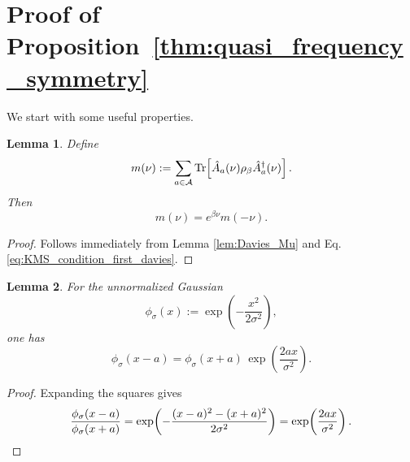 \documentclass[showpacs,amsmath,amssymb,twocolumn,prx,superscriptaddress,10pt,aps,nofootinbib]{revtex4-2}
\newtheorem{lemma}{Lemma}
\begin{document}


\section{Proof of Proposition~\ref{thm:quasi_frequency_symmetry}}
\label{app:proof_quasi_frequency_symmetry}

We start with some useful properties.

\begin{lemma}
\label{lem:DB_davies_identity}
Define
\begin{equation}
    m(\nu):=
    \sum_{a\in\mathcal A}
    \Tr\!\left[\hat A_a(\nu)\rho_\beta \hat A_a^\dagger(\nu)\right].
\end{equation}
Then
\begin{equation}
    m(\nu)=e^{\beta\nu}m(-\nu).
\end{equation}
\end{lemma}

\begin{proof}
Follows immediately from Lemma  \ref{lem:Davies_Mu} and Eq. \eqref{eq:KMS_condition_first_davies}.

\end{proof}

\begin{lemma}
\label{lem:Gaussian_reflection}
For the unnormalized Gaussian
\begin{equation}
    \phi_\sigma(x):=\exp\!\left(-\frac{x^2}{2\sigma^2}\right),
\end{equation}
one has
\begin{equation}
    \phi_\sigma(x-a)
    =
    \phi_\sigma(x+a)\,
    \exp\!\left(\frac{2ax}{\sigma^2}\right).
\end{equation}
\end{lemma}

\begin{proof}
Expanding the squares gives
\begin{equation}
\frac{\phi_\sigma(x-a)}{\phi_\sigma(x+a)}
=
\exp\!\left(
-\frac{(x-a)^2-(x+a)^2}{2\sigma^2}
\right)
=
\exp\!\left(\frac{2ax}{\sigma^2}\right).
\qedhere
\end{equation}

\end{proof}
\end{document}
